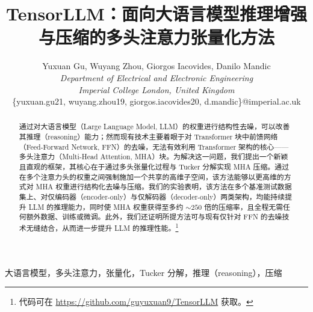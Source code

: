 \documentclass[conference]{IEEEtran}
\begin{document}
\title{TensorLLM：面向大语言模型推理增强与压缩的多头注意力张量化方法}

\author{
Yuxuan Gu, Wuyang Zhou, Giorgos Iacovides, Danilo Mandic \\
\textit{Department of Electrical and Electronic Engineering}\\
\textit{Imperial College London, United Kingdom}\\
\{yuxuan.gu21, wuyang.zhou19, giorgos.iacovides20, d.mandic\}@imperial.ac.uk
}

\maketitle

\begin{abstract}
通过对大语言模型（Large Language Model, LLM）的权重进行结构性去噪，可以改善其推理（reasoning）能力；然而现有技术主要着眼于对 Transformer 块中前馈网络（Feed-Forward Network, FFN）的去噪，无法有效利用 Transformer 架构的核心——多头注意力（Multi-Head Attention, MHA）块。为解决这一问题，我们提出一个新颖且直观的框架，其核心在于通过多头张量化过程与 Tucker 分解实现 MHA 压缩。通过在多个注意力头的权重之间强制施加一个共享的高维子空间，该方法能够以更高维的方式对 MHA 权重进行结构化去噪与压缩。我们的实验表明，该方法在多个基准测试数据集上、对仅编码器（encoder-only）与仅解码器（decoder-only）两类架构，均能持续提升 LLM 的推理能力，同时使 MHA 权重获得至多约 $\sim 250$ 倍的压缩率，且全程无需任何额外数据、训练或微调。此外，我们还证明所提方法可与现有仅针对 FFN 的去噪技术无缝结合，从而进一步提升 LLM 的推理性能。\footnote{代码可在 \href{https://github.com/guyuxuan9/TensorLLM}{https://github.com/guyuxuan9/TensorLLM} 获取。}
\end{abstract}

\begin{IEEEkeywords}
大语言模型，多头注意力，张量化，Tucker 分解，推理（reasoning），压缩
\end{IEEEkeywords}
\end{document}
